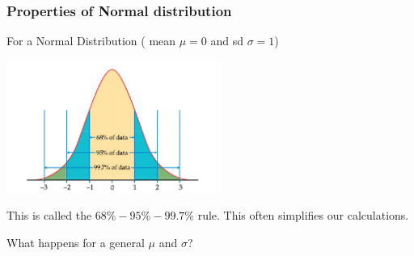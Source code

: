 \documentclass{beamer}\usepackage[]{graphicx}\usepackage[]{color}
\begin{document}
\begin{frame}[fragile]

\frametitle{Properties of Normal distribution}
 For a  Normal Distribution ( mean $\mu=0$ and sd $\sigma=1$)
\begin{center}
\includegraphics[width=7cm,keepaspectratio]{6895997.jpeg} 
\end{center}

This is called the $68 \%- 95 \% - 99.7 \% $ rule. This often simplifies our calculations.

What happens for a general $\mu$ and $\sigma$?

\end{frame}
\end{document}
